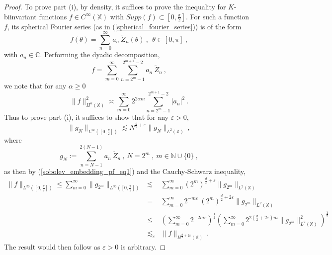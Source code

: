 \documentclass[12pt]{amsart}
\theoremstyle{definition}
\newcommand{\C}{\mathbb C}%
\newcommand{\N}{\mathbb N}%
\newcommand{\X}{\mathbb X}%
\numberwithin{equation}{section}
\begin{document}
\begin{proof}
To prove part (i), by density, it suffices to prove the inequality for $K$-biinvariant functions $f \in C^\infty(\X)$ with $Supp(f) \subset [0,\frac{\pi}{2}]$. For such a function $f$, its spherical Fourier series (as in (\ref{spherical_fourier_series})) is of the form
\begin{equation*}
f(\theta)=\sum_{n=0}^\infty a_n \:\tilde{Z}_n(\theta)\:,\:\:\theta \in [0,\pi]\:,
\end{equation*}
with $a_n \in \C$. Performing the dyadic decomposition,
\begin{equation*}
f=\sum_{m=0}^\infty \sum_{n=2^m-1}^{2^{m+1}-2} a_n\:\tilde{Z}_n\:,
\end{equation*} 
we note that for any $\alpha \ge 0$
\begin{equation*}
\|f\|^2_{H^{\alpha}(\X)} \asymp \sum_{m=0}^\infty 2^{2\alpha m} \sum_{n=2^m-1}^{2^{m+1}-2} |a_n|^2\:.
\end{equation*}
Thus to prove part (i), it suffices to show that for any $\varepsilon>0$,
\begin{equation} \label{sobolev_embedding_pf_eq1}
\|g_N\|_{L^\infty\left(\left[0,\frac{\pi}{2}\right]\right)} \lesssim N^{\frac{d}{2}+\varepsilon}\|g_N\|_{L^2(\X)}\:,
\end{equation}
where 
\begin{equation*}
g_N:= \sum_{n=N-1}^{2(N-1)} a_n\:\tilde{Z}_n\:,\:N=2^m\:,\:m \in \N \cup \{0\}\:,
\end{equation*}
as then by (\ref{sobolev_embedding_pf_eq1}) and the Cauchy-Schwarz inequality,
\begin{eqnarray*}
\|f\|_{L^\infty\left(\left[0,\frac{\pi}{2}\right]\right)} \le \sum_{m=0}^\infty \|g_{2^m}\|_{L^\infty\left(\left[0,\frac{\pi}{2}\right]\right)} &\lesssim & \sum_{m=0}^\infty {(2^m)}^{\frac{d}{2}+\varepsilon}  \|g_{2^m}\|_{L^2(\X)} \\
&=& \sum_{m=0}^\infty 2^{-m\varepsilon}\:{(2^m)}^{\frac{d}{2}+2\varepsilon}  \|g_{2^m}\|_{L^2(\X)} \\
& \le & \left(\sum_{m=0}^\infty 2^{-2m\varepsilon}\right)^{\frac{1}{2}} \left(\sum_{m=0}^\infty 2^{2\left(\frac{d}{2}+2\varepsilon\right)m}\|g_{2^m}\|^2_{L^2(\X)}\right)^{\frac{1}{2}} \\
&\lesssim_{\varepsilon} & \|f\|_{H^{\frac{d}{2}+2\varepsilon}(\X)}\:.
\end{eqnarray*}
The result would then follow as $\varepsilon>0$ is arbitrary.


\end{proof}
\end{document}
